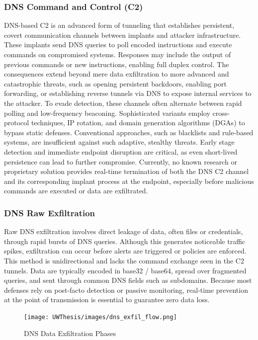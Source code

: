 \documentclass [11pt, proquest] {uwthesis}[2020/02/24]
\begin{document}
\subsubsection{DNS Command and Control (C2)}
DNS-based C2 is an advanced form of tunneling that establishes persistent, covert communication channels between implants and attacker infrastructure. These implants send DNS queries to poll encoded instructions and execute commands on compromised systems. Responses may include the output of previous commands or new instructions, enabling full duplex control. The consequences extend beyond mere data exfiltration to more advanced and catastrophic threats, such as opening persistent backdoors, enabling port forwarding, or establishing reverse tunnels via DNS to expose internal services to the attacker. To evade detection, these channels often alternate between rapid polling and low-frequency beaconing. Sophisticated variants employ cross-protocol techniques, IP rotation, and domain generation algorithms (DGAs) to bypass static defenses. Conventional approaches, such as blacklists and rule-based systems, are insufficient against such adaptive, stealthy threats. Early stage detection and immediate endpoint disruption are critical, as even short-lived persistence can lead to further compromise. Currently, no known research or proprietary solution provides real-time termination of both the DNS C2 channel and its corresponding implant process at the endpoint, especially before malicious commands are executed or data are exfiltrated.


\subsubsection{DNS Raw Exfiltration}
Raw DNS exfiltration involves direct leakage of data, often files or credentials, through rapid bursts of DNS queries. Although this generates noticeable traffic spikes, exfiltration can occur before alerts are triggered or policies are enforced.
This method is unidirectional and lacks the command exchange seen in the C2 tunnels. Data are typically encoded in base32 / base64, spread over fragmented queries, and sent through common DNS fields such as subdomains. Because most defenses rely on post-facto detection or passive monitoring, real-time prevention at the point of transmission is essential to guarantee zero data loss.

\label{sec:dns c2 flow}
\begin{figure}[h]
\texttt{[image: UWThesis/images/dns\_exfil\_flow.png]}
\caption{DNS Data Exfiltration Phases}
\end{figure}
\end{document}
